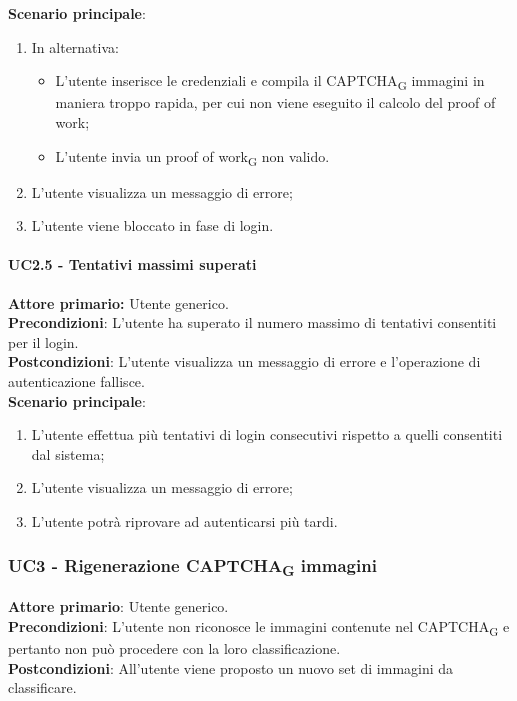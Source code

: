 \textbf{Scenario principale}:
\begin{enumerate}
    \item In alternativa:
    \begin{itemize}
        \item L'utente inserisce le credenziali e compila il CAPTCHA\textsubscript{G} immagini in maniera troppo rapida, per cui non viene eseguito il calcolo del proof of work;
        \item L'utente invia un proof of work\textsubscript{G} non valido.
    \end{itemize}
	\item L’utente visualizza un messaggio di errore;
	\item L'utente viene bloccato in fase di login.
\end{enumerate}

\paragraph{UC2.5 - Tentativi massimi superati}
\textbf{Attore primario:} Utente generico.\\
\textbf{Precondizioni}: L'utente ha superato il numero massimo di tentativi consentiti per il login.\\
\textbf{Postcondizioni}: L’utente visualizza un messaggio di errore e l’operazione di autenticazione fallisce.\\

\textbf{Scenario principale}:
\begin{enumerate}
    \item L'utente effettua più tentativi di login consecutivi rispetto a quelli consentiti dal sistema;
	\item L’utente visualizza un messaggio di errore;
	\item L'utente potrà  riprovare ad autenticarsi più tardi.
\end{enumerate}

\subsubsection{UC3 - Rigenerazione CAPTCHA\textsubscript{G} immagini}
\textbf{Attore primario}: Utente generico.\\
\textbf{Precondizioni}: L'utente non riconosce le immagini contenute nel CAPTCHA\textsubscript{G} e pertanto non può procedere con la loro classificazione.\\
\textbf{Postcondizioni}: All'utente viene proposto un nuovo set di immagini da classificare.\\

